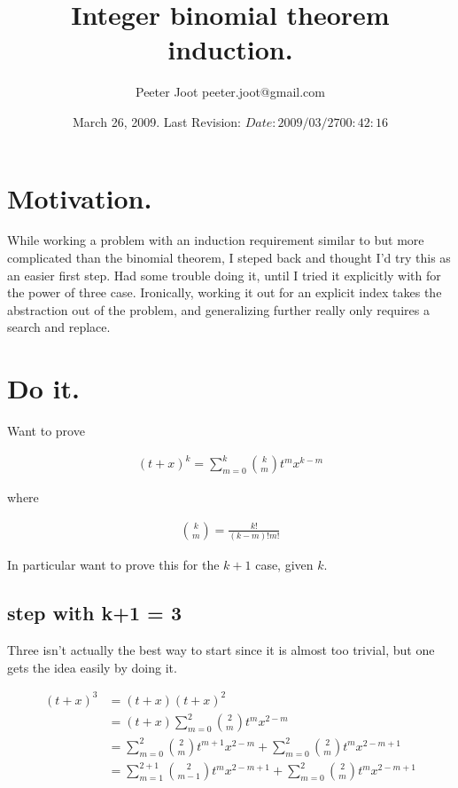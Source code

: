 \documentclass{article}
\title{ Integer binomial theorem induction. }
\author{Peeter Joot \quad peeter.joot@gmail.com }
\date{ March 26, 2009.  Last Revision: $Date: 2009/03/27 00:42:16 $ }
\begin{document}
\maketitle{}


\section{ Motivation. }

While working a problem with an induction requirement similar to but more 
complicated than the binomial theorem, I steped back and thought I'd try
this as an easier first step.  Had some trouble doing it, until I tried it
explicitly with for the power of three case.  Ironically, working it
out for an explicit index takes the abstraction out of the problem, and
generalizing further really only requires a search and replace.

\section{ Do it. }

Want to prove

\begin{align}
(t + x)^k = \sum_{m=0}^k \binom{k}{m} t^m x^{k-m}
\end{align}

where

\begin{align}
\binom{k}{m} = \frac{k!}{(k-m)!m!}
\end{align}

In particular want to prove this for the $k+1$ case, given $k$.

\subsection{ step with k+1 = 3 }

Three isn't actually the best way to start since it is almost too trivial, but
one gets the idea easily by doing it.

\begin{align*}
(t + x)^3 
&= (t + x)(t + x)^2  \\
&= (t + x)\sum_{m=0}^2 \binom{2}{m} t^m x^{2-m} \\
&= 
\sum_{m=0}^2 \binom{2}{m} t^{m+1} x^{2-m} 
+ \sum_{m=0}^2 \binom{2}{m} t^{m} x^{2-m + 1} \\
&= 
\sum_{m=1}^{2 + 1} \binom{2}{m-1} t^{m} x^{2 - m + 1} 
+ \sum_{m=0}^2 \binom{2}{m} t^{m} x^{2-m + 1} \\
\end{align*}
\end{document}
